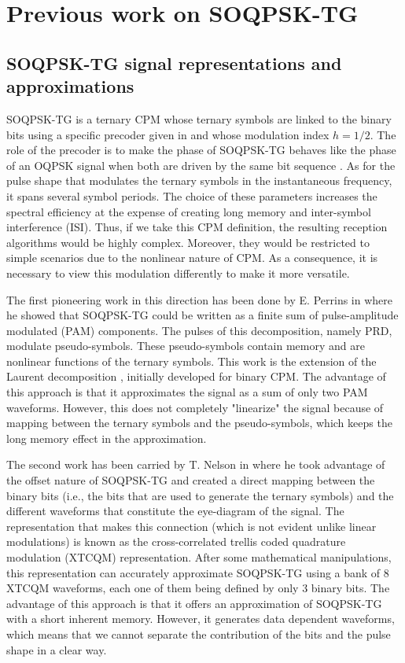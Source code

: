 \section*{Previous work on SOQPSK-TG}
\subsection*{SOQPSK-TG signal representations and approximations}
SOQPSK-TG is a ternary CPM whose ternary symbols are linked to the binary bits using a specific precoder given in \cite{irig106} and whose modulation index $h=1/2$. The role of the precoder is to make the phase of SOQPSK-TG behaves like the phase of an OQPSK signal when both are driven by the same bit sequence \cite{these_perrins}. As for the pulse shape that modulates the ternary symbols in the instantaneous frequency, it spans several symbol periods. The choice of these parameters increases the spectral efficiency at the expense of creating long memory and inter-symbol interference (ISI). Thus, if we take this CPM definition, the resulting reception algorithms would be highly complex. Moreover, they would be restricted to simple scenarios due to the nonlinear nature of CPM. As a consequence, it is necessary to view this modulation differently to make it more versatile.

The first pioneering work in this direction has been done by E. Perrins in \cite{these_perrins} where he showed that SOQPSK-TG could be written as a finite sum of pulse-amplitude modulated (PAM) components. The pulses of this decomposition, namely PRD, modulate pseudo-symbols. These pseudo-symbols contain memory and are nonlinear functions of the ternary symbols. This work is the extension of the Laurent decomposition \cite{pam_representation_binary}, initially developed for binary CPM. The advantage of this approach is that it approximates the signal as a sum of only two PAM waveforms. However, this does not completely "linearize" the signal because of mapping between the ternary symbols and the pseudo-symbols, which keeps the long memory effect in the approximation. 

The second work has been carried by T. Nelson in \cite{these_nelson} where he took advantage of the offset nature of SOQPSK-TG and created a direct mapping between the binary bits (i.e., the bits that are used to generate the ternary symbols) and the different waveforms that constitute the eye-diagram of the signal. The representation that makes this connection (which is not evident unlike linear modulations) is known as the cross-correlated trellis coded quadrature modulation (XTCQM) representation. After some mathematical manipulations, this representation can accurately approximate SOQPSK-TG using a bank of $8$ XTCQM waveforms, each one of them being defined by only $3$ binary bits. The advantage of this approach is that it offers an approximation of SOQPSK-TG with a short inherent memory. However, it generates data dependent waveforms, which means that we cannot separate the contribution of the bits and the pulse shape in a clear way.  

